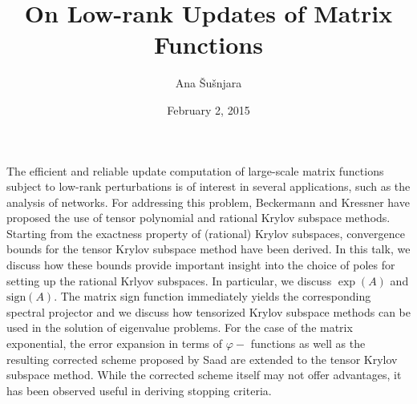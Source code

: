 \documentclass{article}
\title{On Low-rank Updates of Matrix Functions}
\author{Ana \v{S}u\v{s}njara}
\affil{PhD student at EPF Lausanne}
\date{February 2, 2015}
\begin{document}
\maketitle

The efficient and reliable update computation of large-scale matrix functions subject to low-rank perturbations is of interest in several applications, such as the analysis of networks. For addressing this problem, Beckermann and Kressner have proposed the use of tensor polynomial and rational Krylov subspace methods. Starting from the exactness property of (rational) Krylov subspaces, convergence bounds for the tensor Krylov subspace method have been derived. In this talk, we discuss how these bounds provide important insight into the choice of poles for setting up the rational Krlyov subspaces. In particular, we discuss $\exp(A)$ and $\textrm{sign}(A)$. The matrix sign function immediately yields the corresponding spectral projector and we discuss how tensorized Krylov subspace methods can be used in the solution of eigenvalue problems. For the case of the matrix exponential, the error expansion in terms of $\varphi-$ functions as well as the resulting corrected scheme proposed by Saad are extended to the tensor Krylov subspace method. While the corrected scheme itself may not offer advantages, it has been observed useful in deriving stopping criteria.  
\end{document}
